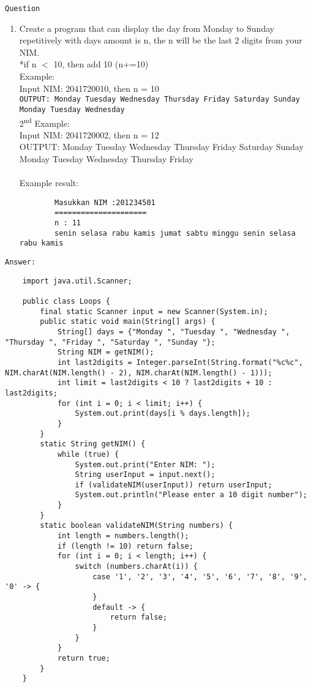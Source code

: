 \documentclass[12pt,titlepage]{article}
\begin{document}
\texttt{Question}

\begin{enumerate}
    \item Create a program that can display the day from Monday to Sunday repetitively with days amount is n, the n will be the last 2 digits from your NIM.\mbox{}\\
    *if n $<$ 10, then add 10 (n+=10)\mbox{}\\
    Example: \mbox{}\\
    Input NIM: 2041720010, then n = 10\mbox{}\\
    \texttt{OUTPUT: Monday Tuesday Wednesday Thursday Friday Saturday Sunday Monday Tuesday Wednesday}\mbox{}\\
    2\textsuperscript{nd} Example: \mbox{}\\
    Input NIM: 2041720002, then n = 12\mbox{}\\
    OUTPUT: Monday Tuesday Wednesday Thursday Friday Saturday Sunday Monday Tuesday Wednesday Thursday Friday \mbox{}\\
    \mbox{}\\
    Example result: \mbox{}\\
    \begin{verbatim}
        Masukkan NIM :201234501
        =====================
        n : 11
        senin selasa rabu kamis jumat sabtu minggu senin selasa rabu kamis
    \end{verbatim}
\end{enumerate}

\texttt{Answer: }

\newpage

\begin{verbatim}
    import java.util.Scanner;

    public class Loops {
        final static Scanner input = new Scanner(System.in);
        public static void main(String[] args) {
            String[] days = {"Monday ", "Tuesday ", "Wednesday ", "Thursday ", "Friday ", "Saturday ", "Sunday "};          
            String NIM = getNIM();
            int last2digits = Integer.parseInt(String.format("%c%c", NIM.charAt(NIM.length() - 2), NIM.charAt(NIM.length() - 1)));
            int limit = last2digits < 10 ? last2digits + 10 : last2digits;
            for (int i = 0; i < limit; i++) {
                System.out.print(days[i % days.length]);
            }
        }
        static String getNIM() {
            while (true) {
                System.out.print("Enter NIM: ");
                String userInput = input.next();
                if (validateNIM(userInput)) return userInput;
                System.out.println("Please enter a 10 digit number");
            }
        }
        static boolean validateNIM(String numbers) {
            int length = numbers.length();
            if (length != 10) return false;
            for (int i = 0; i < length; i++) {
                switch (numbers.charAt(i)) {
                    case '1', '2', '3', '4', '5', '6', '7', '8', '9', '0' -> {
                    }
                    default -> {
                        return false;
                    }
                }
            }
            return true;
        }
    }
\end{verbatim}
\end{document}
